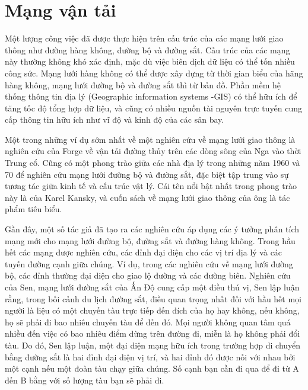 \section{Mạng vận tải}
Một lượng công việc đã được thực hiện trên cấu trúc của các mạng lưới giao thông như đường hàng không, đường bộ và đường sắt. Cấu trúc của các mạng này thường không khó xác định, mặc dù việc biên dịch dữ liệu có thể tốn nhiều công sức. Mạng lưới hàng không có thể được xây dựng từ thời gian biểu của hãng hàng không, mạng lưới đường bộ và đường sắt thì từ bản đồ. Phần mềm hệ thống thông tin địa lý (Geographic information systems -GIS) có thể hữu ích để tăng tốc độ tổng hợp dữ liệu, và cũng có nhiều nguồn tài nguyên trực tuyến cung cấp thông tin hữu ích như vĩ độ và kinh độ của các sân bay.\par
Một trong những ví dụ sớm nhất về một nghiên cứu về mạng lưới giao thông là nghiên cứu của Forge về vận tải đường thủy trên các dòng sông của Nga vào thời Trung cổ. Cũng có một phong trào giữa các nhà địa lý trong những năm 1960 và 70 để nghiên cứu mạng lưới đường bộ và đường sắt, đặc biệt tập trung vào sự tương tác giữa kinh tế và cấu trúc vật lý. Cái tên nổi bật nhất trong phong trào này là của Karel Kansky, và cuốn sách về mạng lưới giao thông của ông là tác phẩm tiêu biểu.\par
Gần đây, một số tác giả đã tạo ra các nghiên cứu áp dụng các ý tưởng phân tích mạng mới cho mạng lưới đường bộ, đường sắt và đường hàng không. Trong hầu hết các mạng được nghiên cứu, các đỉnh đại diện cho các vị trí địa lý và các tuyến đường cạnh giữa chúng. Ví dụ, trong các nghiên cứu về mạng lưới đường bộ, các đỉnh thường đại diện cho giao lộ đường và các đường biên. Nghiên cứu của Sen, mạng lưới đường sắt của Ấn Độ cung cấp một điều thú vị, Sen lập luận rằng, trong bối cảnh du lịch đường sắt, điều quan trọng nhất đối với hầu hết mọi người là liệu có một chuyến tàu trực tiếp đến đích của họ hay không, nếu không, họ sẽ phải đi bao nhiêu chuyến tàu để đến đó. Mọi người không quan tâm quá nhiều đến việc có bao nhiêu điểm dừng trên đường đi, miễn là họ không phải đổi tàu. Do đó, Sen lập luận, một đại diện mạng hữu ích trong trường hợp di chuyển bằng đường sắt là hai đỉnh đại diện vị trí, và hai đỉnh đó được nối với nhau bởi một cạnh nếu một đoàn tàu chạy giữa chúng. Số cạnh bạn cần đi qua để đi từ A đến B bằng với số lượng tàu bạn sẽ phải đi.\par

